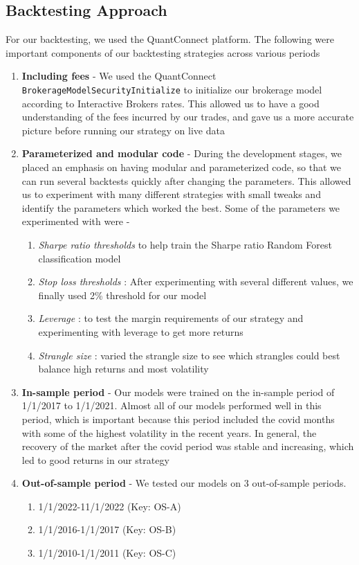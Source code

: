 \documentclass[10pt]{article}
\theoremstyle{definition}
\begin{document}
\subsection{Backtesting Approach}
For our backtesting, we used the QuantConnect platform. The following were important components of our backtesting strategies across various periods 
\begin{enumerate}
    \item \textbf{Including fees} - We used the QuantConnect \texttt{BrokerageModelSecurityInitialize} to initialize our brokerage model according to Interactive Brokers rates. This allowed us to have a good understanding of the fees incurred by our trades, and gave us a more accurate picture before running our strategy on live data
    \item \textbf{Parameterized and modular code} - During the development stages, we placed an emphasis on having modular and parameterized code, so that we can run several backtests quickly after changing the parameters. This allowed us to experiment with many different strategies with small tweaks and identify the parameters which worked the best. Some of the parameters we experimented with were -
    \begin{enumerate}
        \item \textit{Sharpe ratio thresholds} to help train the Sharpe ratio Random Forest classification model
        \item \textit{Stop loss thresholds} : After experimenting with several different values, we finally used 2\% threshold for our model
        \item \textit{Leverage} : to test the margin requirements of our strategy and experimenting with leverage to get more returns
        \item \textit{Strangle size} : varied the strangle size to see which strangles could best balance high returns and most volatility
    \end{enumerate}
    \item \textbf{In-sample period} - Our models were trained on the in-sample period of 1/1/2017 to 1/1/2021. Almost all of our models performed well in this period, which is important because this period included the covid months with some of the highest volatility in the recent years. In general, the recovery of the market after the covid period was stable and increasing, which led to good returns in our strategy
    \item \textbf{Out-of-sample period} - We tested our models on 3 out-of-sample periods.
    \begin{enumerate}
        \item 1/1/2022-11/1/2022 (Key: OS-A)
        \item 1/1/2016-1/1/2017 (Key: OS-B)
        \item 1/1/2010-1/1/2011 (Key: OS-C)
    \end{enumerate}
\end{enumerate}
\end{document}
